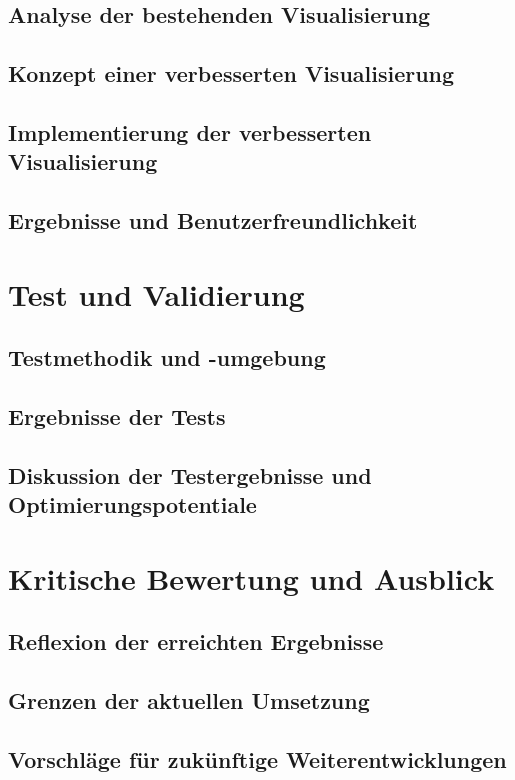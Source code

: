 \documentclass[a4paper, 12pt]{article} %
\begin{document}
\subsection{Analyse der bestehenden Visualisierung}
\subsection{Konzept einer verbesserten Visualisierung}
\subsection{Implementierung der verbesserten Visualisierung}
\subsection{Ergebnisse und Benutzerfreundlichkeit}

\section{Test und Validierung}
\subsection{Testmethodik und -umgebung}
\subsection{Ergebnisse der Tests}
\subsection{Diskussion der Testergebnisse und Optimierungspotentiale}

\section{Kritische Bewertung und Ausblick}
\subsection{Reflexion der erreichten Ergebnisse}
\subsection{Grenzen der aktuellen Umsetzung}
\subsection{Vorschläge für zukünftige Weiterentwicklungen}


\clearpage
\begingroup
\renewcommand{\bibfont}{\fontsize{13pt}{12pt}\selectfont}  
\sloppy
\nocite{*}
\printbibliography
\endgroup
\end{document}

